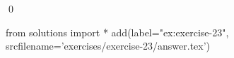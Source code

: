
\begin{ex} 
  \label{ex:exercise-23}
  
  \qed
\end{ex} 
\begin{python0}
from solutions import *
add(label="ex:exercise-23",
    srcfilename='exercises/exercise-23/answer.tex') 
\end{python0}
